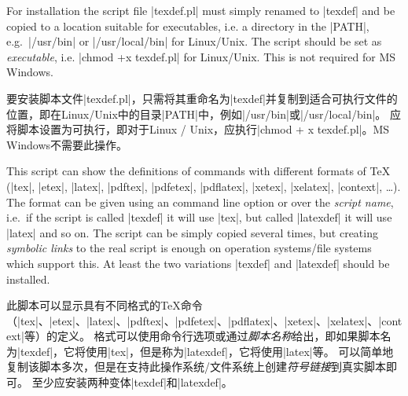 \documentclass{article}
\begin{document}
For installation the script file |texdef.pl| must simply renamed to |texdef| and be copied to a location suitable for executables,
i.e. a directory in the |PATH|, e.g.\ |/usr/bin| or |/usr/local/bin| for Linux/Unix.
The script should be set as \emph{executable}, i.e. |chmod +x texdef.pl| for Linux/Unix.
This is not required for MS Windows.

要安装脚本文件|texdef.pl|，只需将其重命名为|texdef|并复制到适合可执行文件的位置，即在Linux/Unix中的目录|PATH|中，例如|/usr/bin|或|/usr/local/bin|。
应将脚本设置为可执行，即对于Linux / Unix，应执行|chmod + x texdef.pl|。MS Windows不需要此操作。


This script can show the definitions of commands with different formats of TeX
(|tex|, |etex|, |latex|, |pdftex|, |pdfetex|, |pdflatex|, |xetex|, |xelatex|, |context|, \ldots).
The format can be given using an command line option or over the \emph{script name},
i.e.\ if the script is called |texdef| it will use |tex|, but called |latexdef|
it will use |latex| and so on.
The script can be simply copied several times, but creating \emph{symbolic links}
to the real script is enough on operation systems/file systems which support
this.
At least the two variations |texdef| and |latexdef| should be installed.

此脚本可以显示具有不同格式的TeX命令（|tex|、|etex|、|latex|、|pdftex|、|pdfetex|、|pdflatex|、|xetex|、|xelatex|、|context|等）的定义。
格式可以使用命令行选项或通过\emph{脚本名称}给出，即如果脚本名为|texdef|，它将使用|tex|，但是称为|latexdef|，它将使用|latex|等。
可以简单地复制该脚本多次，但是在支持此操作系统/文件系统上创建\emph{符号链接}到真实脚本即可。
至少应安装两种变体|texdef|和|latexdef|。

\end{document}
